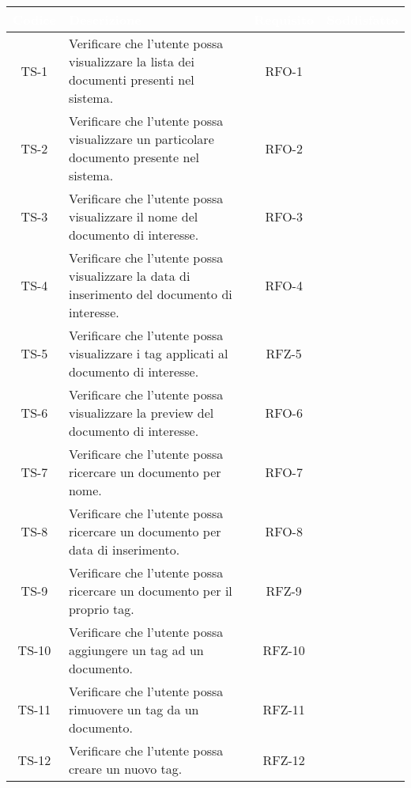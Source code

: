 \begingroup
\setlength{\tabcolsep}{10pt}
\renewcommand{\arraystretch}{1.5}
\begin{xltabular}{\textwidth}{| c | X | c | c |}
    \hline
     \textbf{\textcolor{white}{Codice}} & \textbf{\textcolor{white}{Descrizione}} & \textbf{\textcolor{white}{Requisito}} & \textbf{\textcolor{white}{Soddisfatto}}\\
    \hline
    \endhead
    TS-1 & Verificare che l’utente possa visualizzare la lista dei documenti presenti nel sistema. & RFO-1 & \textcolor{xmarkcolor}{} \\
    \hline
    TS-2 & Verificare che l’utente possa visualizzare un particolare documento presente nel sistema. & RFO-2 & \textcolor{xmarkcolor}{} \\
    \hline
    TS-3 & Verificare che l'utente possa visualizzare il nome del documento di interesse. & RFO-3 & \textcolor{xmarkcolor}{} \\
    \hline
    TS-4 & Verificare che l’utente possa visualizzare la data di inserimento del documento di interesse. & RFO-4 & \textcolor{xmarkcolor}{} \\
    \hline
    TS-5 & Verificare che l’utente possa visualizzare i tag applicati al documento di interesse. & RFZ-5 & \textcolor{xmarkcolor}{} \\
    \hline
    TS-6 & Verificare che l’utente possa visualizzare la preview del documento di interesse. & RFO-6 & \textcolor{xmarkcolor}{} \\
    \hline
    TS-7 & Verificare che l’utente possa ricercare un documento per nome. & RFO-7 & \textcolor{xmarkcolor}{} \\
    \hline
    TS-8 & Verificare che l’utente possa ricercare un documento per data di inserimento. & RFO-8 & \textcolor{xmarkcolor}{} \\
    \hline
    TS-9 &  Verificare che l’utente possa ricercare un documento per il proprio tag. & RFZ-9 & \textcolor{xmarkcolor}{} \\
    \hline
    TS-10 & Verificare che l’utente possa aggiungere un tag ad un documento. & RFZ-10 & \textcolor{xmarkcolor}{} \\
    \hline
    TS-11 & Verificare che l’utente possa rimuovere un tag da un documento. & RFZ-11 & \textcolor{xmarkcolor}{} \\
    \hline
    TS-12 & Verificare che l’utente possa creare un nuovo tag. & RFZ-12 & \textcolor{xmarkcolor}{} \\

\end{xltabular}
